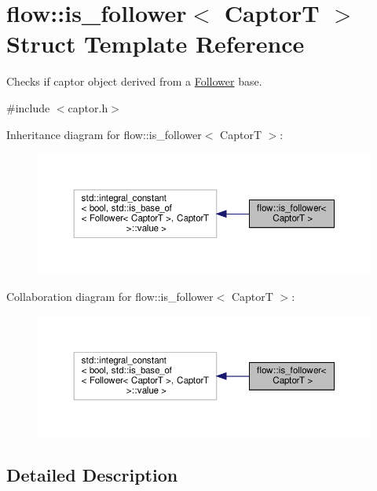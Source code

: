 \hypertarget{structflow_1_1is__follower}{}\section{flow\+:\+:is\+\_\+follower$<$ CaptorT $>$ Struct Template Reference}
\label{structflow_1_1is__follower}


Checks if captor object derived from a \hyperlink{classflow_1_1_follower}{Follower} base.  




{\ttfamily \#include $<$captor.\+h$>$}



Inheritance diagram for flow\+:\+:is\+\_\+follower$<$ CaptorT $>$\+:\nopagebreak
\begin{figure}[H]
\begin{center}
\leavevmode
\includegraphics[width=350pt]{structflow_1_1is__follower__inherit__graph}
\end{center}
\end{figure}


Collaboration diagram for flow\+:\+:is\+\_\+follower$<$ CaptorT $>$\+:\nopagebreak
\begin{figure}[H]
\begin{center}
\leavevmode
\includegraphics[width=350pt]{structflow_1_1is__follower__coll__graph}
\end{center}
\end{figure}


\subsection{Detailed Description}
